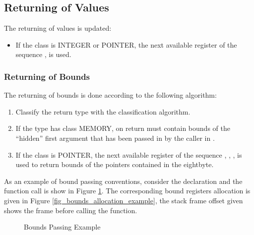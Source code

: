\subsection{Returning of Values}

The returning of values is updated:

\begin{itemize}
\item If the class is INTEGER or POINTER, the next available register
   of the sequence \RAX, \RDX is used.
\end{itemize}

\subsubsection{Returning of Bounds}
The returning of bounds is done according to the following algorithm:
\begin{enumerate}
\item Classify the return type with the classification algorithm.

\item If the type has class MEMORY, on return  must contain
  bounds of the ``hidden'' first argument that has been passed in by
  the caller in \RDI.

\item If the class is POINTER, the next available register of the sequence
  , , ,  is used to return bounds
  of the pointers contained in the eightbyte.
\end{enumerate}

As an example of bound passing conventions, consider the declaration
and the function call is show in Figure \ref{fig_bounds_passing_example}.
The corresponding bound registers allocation is given in
Figure \ref{fig_bounds_allocation_example}, the stack frame offset given
shows the frame before calling the function.

\begin{figure}[H]
\Hrule
\caption{Bounds Passing Example}
\label{fig_bounds_passing_example}
\begin{center}
\end{center}
\Hrule
\end{figure}

